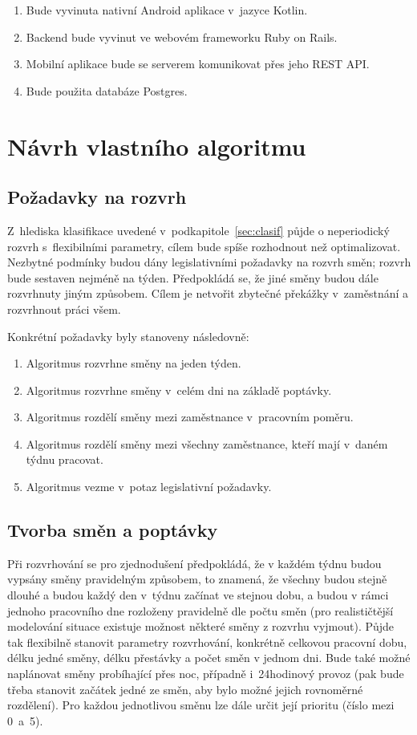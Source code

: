 \documentclass[twoside]{ctuthesis}
\begin{document}
\begin{enumerate}[label=\textbf{S\arabic*.}]
	\item Bude vyvinuta nativní Android aplikace v~jazyce Kotlin.
	\item Backend bude vyvinut ve webovém frameworku Ruby on Rails.
	\item Mobilní aplikace bude se serverem komunikovat přes jeho REST API.
	\item Bude použita databáze Postgres.
\end{enumerate}

\chapter{Návrh vlastního algoritmu}

\section{Požadavky na rozvrh}

Z~hlediska klasifikace uvedené v~podkapitole~\ref{sec:clasif} půjde o neperiodický rozvrh s~flexibilními parametry, cílem bude spíše rozhodnout než optimalizovat. Nezbytné podmínky budou dány legislativními požadavky na rozvrh směn; rozvrh bude sestaven nejméně na týden. Předpokládá se, že jiné směny budou dále rozvrhnuty jiným způsobem. Cílem je netvořit zbytečné překážky v~zaměstnání a rozvrhnout práci všem.

Konkrétní požadavky byly stanoveny následovně:
\begin{enumerate}
	\item Algoritmus rozvrhne směny na jeden týden.
	\item Algoritmus rozvrhne směny v~celém dni na základě poptávky.
	\item Algoritmus rozdělí směny mezi zaměstnance v~pracovním poměru.
	\item Algoritmus rozdělí směny mezi všechny zaměstnance, kteří mají v~daném týdnu pracovat.
	\item Algoritmus vezme v~potaz legislativní požadavky.
\end{enumerate}

\section{Tvorba směn a poptávky}\label{sub:demand}
Při rozvrhování se pro zjednodušení předpokládá, že v každém týdnu budou vypsány směny pravidelným způsobem, to znamená, že všechny budou stejně dlouhé a budou každý den v~týdnu začínat ve stejnou dobu, a budou v rámci jednoho pracovního dne rozloženy pravidelně dle počtu směn (pro realističtější modelování situace existuje možnost některé směny z rozvrhu vyjmout). Půjde tak flexibilně stanovit parametry rozvrhování, konkrétně celkovou pracovní dobu, délku jedné směny, délku přestávky a počet směn v jednom dni. Bude také možné naplánovat směny probíhající přes noc, případně i~24hodinový provoz (pak bude třeba stanovit začátek jedné ze směn, aby bylo možné jejich rovnoměrné rozdělení). Pro každou jednotlivou směnu lze dále určit její prioritu (číslo mezi 0~a~5).
\end{document}
